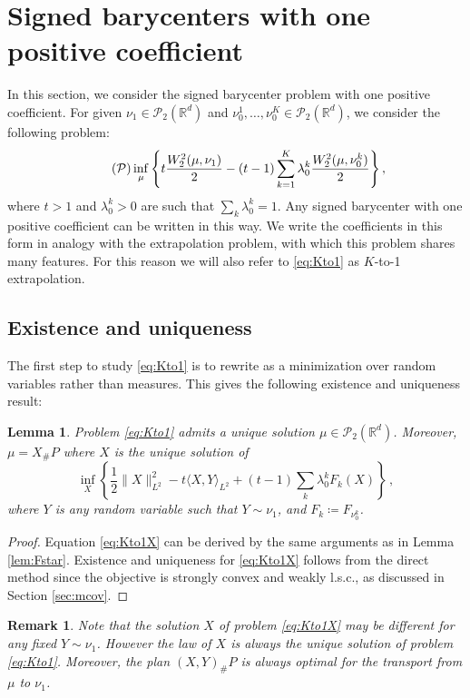 \documentclass[12pt]{amsart}
\numberwithin{equation}{section}
\let\mc=\mathcal
\theoremstyle{plain}
\newtheorem{remark}[theorem]{Remark}
\newtheorem{lemma}[theorem]{Lemma}
\theoremstyle{definition}
\begin{document}
\section{Signed barycenters with one positive coefficient} \label{sec:kto1}

In this section, we consider the signed barycenter problem with one positive coefficient. For given $\nu_1 \in \mc{P}_2(\mathbb{R}^d)$ and $\nu_0^1, \ldots, \nu_0^K \in \mc{P}_2(\mathbb{R}^d)$, we consider the following problem:
\begin{equation}\label{eq:Kto1} \tag{$\mc{P}$}
\inf_\mu \left\{ t \frac{W^2_2(\mu,\nu_1)}{2} - (t-1) \sum_{k=1}^K \lambda_0^k \frac{W^2_2(\mu,\nu_0^k)}{2} \right\},
\end{equation}
where $t>1$ and $\lambda^k_0>0$ are such that $\sum_k \lambda^k_0 = 1$. Any signed barycenter with one positive coefficient can be written in this way. We write the coefficients in this form in analogy with the extrapolation problem, with which this problem shares many features. For this reason we will also refer to \eqref{eq:Kto1} as $K$-to-1 extrapolation. 


\subsection{Existence and uniqueness}
The first step to study \eqref{eq:Kto1} is to rewrite as a minimization over random variables rather than measures. This gives the following existence and uniqueness result:

\begin{lemma}\label{lem:Kto1existence} Problem \eqref{eq:Kto1} admits a unique solution $\mu \in \mc{P}_2(\mathbb{R}^d)$. Moreover, $\mu = X_\#P$ where $X$ is the unique solution of 
\begin{equation}\label{eq:Kto1X}
\inf_{X} \left\{ \frac{1}{2} \|X\|^2_{L^2} -t \langle X,Y\rangle_{L^2}  + (t-1) \sum_{k}\lambda_0^k F_{k}(X) \right\}\,,
\end{equation}
where $Y$ is any random variable such that $ Y \sim \nu_1$, and $F_k \coloneqq F_{\nu_0^k}$.
\end{lemma}
\begin{proof} Equation \eqref{eq:Kto1X} can be derived by the same arguments as in Lemma \ref{lem:Fstar}. Existence and uniqueness for \eqref{eq:Kto1X} follows from the direct method since the objective is strongly convex and weakly l.s.c., as discussed in Section \ref{sec:mcov}.
\end{proof}
\begin{remark} Note that  the solution $X$ of problem  \eqref{eq:Kto1X} may be different for any fixed $Y \sim \nu_1$. However the law of $X$ is always the unique solution of problem \eqref{eq:Kto1}. Moreover, the plan $(X,Y)_\# P$ is always optimal for the transport from $\mu$ to $\nu_1$.
\end{remark}
\end{document}
